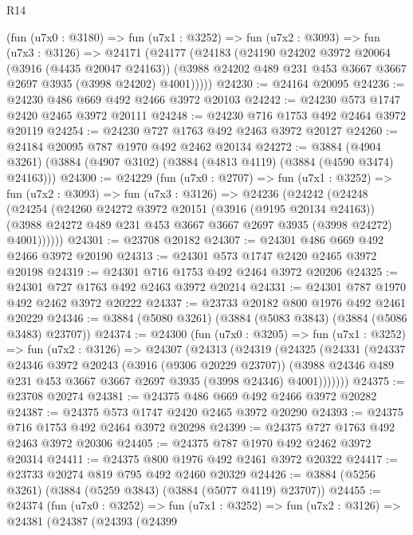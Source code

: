 \begin{lexlean}{R14}
\begin{coremodule}
    (fun (u7x0 : @3180) =>
    fun (u7x1 : @3252) =>
    fun (u7x2 : @3093) =>
    fun (u7x3 : @3126) =>
    @24171
      (@24177
        (@24183
          (@24190
            @24202
            @3972
            @20064
            (@3916 (@4435 @20047 @24163))
            (@3988 @24202 @489 @231 @453 @3667 @3667 @2697 @3935 (@3998 @24202) @4001)))))
@24230 := @24164 @20095
@24236 := @24230 @486 @669 @492 @2466 @3972 @20103
@24242 := @24230 @573 @1747 @2420 @2465 @3972 @20111
@24248 := @24230 @716 @1753 @492 @2464 @3972 @20119
@24254 := @24230 @727 @1763 @492 @2463 @3972 @20127
@24260 := @24184 @20095 @787 @1970 @492 @2462 @20134
@24272 := @3884
    (@4904 @3261)
    (@3884 (@4907 @3102) (@3884 (@4813 @4119) (@3884 (@4590 @3474) @24163)))
@24300 := @24229
    (fun (u7x0 : @2707) =>
    fun (u7x1 : @3252) =>
    fun (u7x2 : @3093) =>
    fun (u7x3 : @3126) =>
    @24236
      (@24242
        (@24248
          (@24254
            (@24260
              @24272
              @3972
              @20151
              (@3916 (@9195 @20134 @24163))
              (@3988 @24272 @489 @231 @453 @3667 @3667 @2697 @3935 (@3998 @24272) @4001))))))
@24301 := @23708 @20182
@24307 := @24301 @486 @669 @492 @2466 @3972 @20190
@24313 := @24301 @573 @1747 @2420 @2465 @3972 @20198
@24319 := @24301 @716 @1753 @492 @2464 @3972 @20206
@24325 := @24301 @727 @1763 @492 @2463 @3972 @20214
@24331 := @24301 @787 @1970 @492 @2462 @3972 @20222
@24337 := @23733 @20182 @800 @1976 @492 @2461 @20229
@24346 := @3884 (@5080 @3261) (@3884 (@5083 @3843) (@3884 (@5086 @3483) @23707))
@24374 := @24300
    (fun (u7x0 : @3205) =>
    fun (u7x1 : @3252) =>
    fun (u7x2 : @3126) =>
    @24307
      (@24313
        (@24319
          (@24325
            (@24331
              (@24337
                @24346
                @3972
                @20243
                (@3916 (@9306 @20229 @23707))
                (@3988 @24346 @489 @231 @453 @3667 @3667 @2697 @3935 (@3998 @24346) @4001)))))))
@24375 := @23708 @20274
@24381 := @24375 @486 @669 @492 @2466 @3972 @20282
@24387 := @24375 @573 @1747 @2420 @2465 @3972 @20290
@24393 := @24375 @716 @1753 @492 @2464 @3972 @20298
@24399 := @24375 @727 @1763 @492 @2463 @3972 @20306
@24405 := @24375 @787 @1970 @492 @2462 @3972 @20314
@24411 := @24375 @800 @1976 @492 @2461 @3972 @20322
@24417 := @23733 @20274 @819 @795 @492 @2460 @20329
@24426 := @3884 (@5256 @3261) (@3884 (@5259 @3843) (@3884 (@5077 @4119) @23707))
@24455 := @24374
    (fun (u7x0 : @3252) =>
    fun (u7x1 : @3252) =>
    fun (u7x2 : @3126) =>
    @24381
      (@24387
        (@24393
          (@24399

\end{coremodule}
\end{lexlean}

